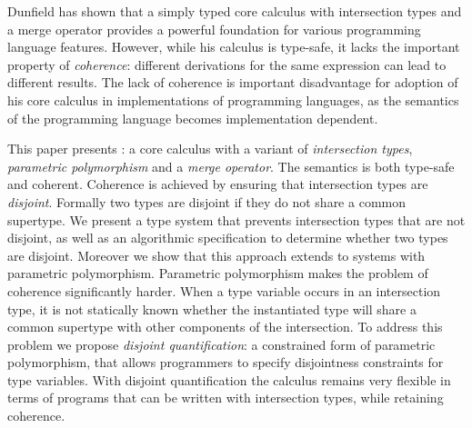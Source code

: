 Dunfield has shown that a simply typed core calculus with
intersection types and a merge operator provides a powerful foundation
for various programming language features. However, while his calculus
is type-safe, it lacks the important property of \emph{coherence}:
different derivations for the same expression can lead to different
results. The lack of coherence is important disadvantage for adoption
of his core calculus in implementations of programming languages, as
the semantics of the programming language becomes implementation
dependent.

This paper presents \name: a core calculus with a variant of
\emph{intersection types}, \emph{parametric polymorphism} and a
\emph{merge operator}. The semantics \name is both type-safe and
coherent. Coherence is achieved by ensuring that intersection types
are \emph{disjoint}. Formally two types are disjoint if they do not
share a common supertype. We present a type system that prevents
intersection types that are not disjoint, as well as an algorithmic
specification to determine whether two types are disjoint. Moreover we
show that this approach extends to systems with parametric
polymorphism. Parametric polymorphism makes the problem of coherence
significantly harder. When a type variable occurs in an intersection
type, it is not statically known whether the instantiated type will
share a common supertype with other components of the intersection.
To address this problem we propose \emph{disjoint quantification}: a
constrained form of parametric polymorphism, that allows programmers
to specify disjointness constraints for type variables. With disjoint
quantification the calculus remains very flexible in terms of programs
that can be written with intersection types, while retaining coherence.
